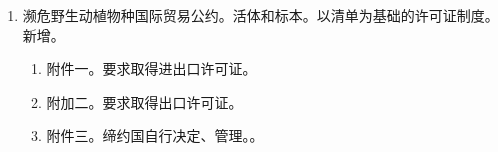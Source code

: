 \begin{enumerate}
\begin{enumerate}
\begin{enumerate}
                  \item 2020 年以后。
                        \begin{enumerate}
                          \item 国家自主贡献方式。不区分是否为发达、工业化、发展中国家。
                          \item 有减排义务，但不再适用公约的强制摊派指标。
                        \end{enumerate}
                \end{enumerate}
          \item 濒危野生动植物种国际贸易公约。活体和标本。以清单为基础的许可证制度。新增。
                \begin{enumerate}
                  \item 附件一。要求取得进出口许可证。
                  \item 附加二。要求取得出口许可证。
                  \item 附件三。缔约国自行决定、管理。。
                \end{enumerate}
        \end{enumerate}
\end{enumerate}
